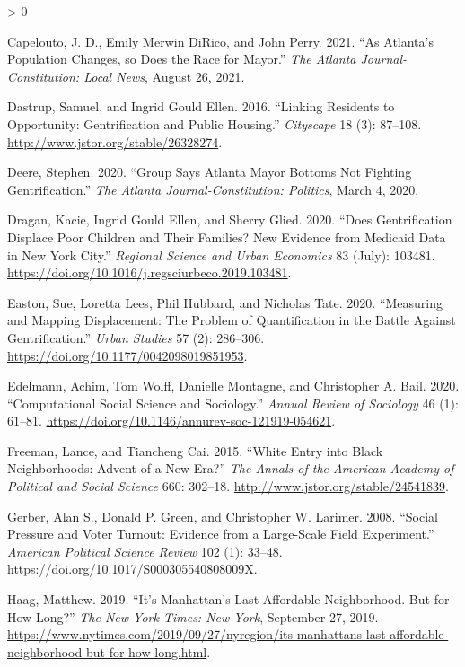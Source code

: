 \documentclass[
  12pt,
]{article}
\newlength{\cslhangindent}
\newenvironment{CSLReferences}[2] %
 {%
  \setlength{\parindent}{0pt}
  \ifodd #1 \everypar{\setlength{\hangindent}{\cslhangindent}}\ignorespaces\fi
  \ifnum #2 > 0
  \setlength{\parskip}{#2\baselineskip}
  \fi
 }%
 {}
\begin{document}
\begin{CSLReferences}{1}{0}
\leavevmode\hypertarget{ref-Capelouto2021}{}%
Capelouto, J. D., Emily Merwin DiRico, and John Perry. 2021. {``As {Atlanta}'s Population Changes, so Does the Race for Mayor.''} \emph{The Atlanta Journal-Constitution: Local News}, August 26, 2021.

\leavevmode\hypertarget{ref-Dastrup2016}{}%
Dastrup, Samuel, and Ingrid Gould Ellen. 2016. {``Linking {Residents} to {Opportunity}: {Gentrification} and {Public Housing}.''} \emph{Cityscape} 18 (3): 87--108. \url{http://www.jstor.org/stable/26328274}.

\leavevmode\hypertarget{ref-Deere2020}{}%
Deere, Stephen. 2020. {``Group Says {Atlanta Mayor Bottoms} Not Fighting Gentrification.''} \emph{The Atlanta Journal-Constitution: Politics}, March 4, 2020.

\leavevmode\hypertarget{ref-Dragan2020}{}%
Dragan, Kacie, Ingrid Gould Ellen, and Sherry Glied. 2020. {``Does Gentrification Displace Poor Children and Their Families? {New} Evidence from Medicaid Data in {New York City}.''} \emph{Regional Science and Urban Economics} 83 (July): 103481. \url{https://doi.org/10.1016/j.regsciurbeco.2019.103481}.

\leavevmode\hypertarget{ref-Easton2020}{}%
Easton, Sue, Loretta Lees, Phil Hubbard, and Nicholas Tate. 2020. {``Measuring and Mapping Displacement: {The} Problem of Quantification in the Battle Against Gentrification.''} \emph{Urban Studies} 57 (2): 286--306. \url{https://doi.org/10.1177/0042098019851953}.

\leavevmode\hypertarget{ref-Edelmann2020}{}%
Edelmann, Achim, Tom Wolff, Danielle Montagne, and Christopher A. Bail. 2020. {``Computational {Social Science} and {Sociology}.''} \emph{Annual Review of Sociology} 46 (1): 61--81. \url{https://doi.org/10.1146/annurev-soc-121919-054621}.

\leavevmode\hypertarget{ref-Freeman2015}{}%
Freeman, Lance, and Tiancheng Cai. 2015. {``White {Entry} into {Black Neighborhoods}: {Advent} of a {New Era}?''} \emph{The Annals of the American Academy of Political and Social Science} 660: 302--18. \url{http://www.jstor.org/stable/24541839}.

\leavevmode\hypertarget{ref-Gerber2008}{}%
Gerber, Alan S., Donald P. Green, and Christopher W. Larimer. 2008. {``Social {Pressure} and {Voter Turnout}: {Evidence} from a {Large-Scale Field Experiment}.''} \emph{American Political Science Review} 102 (1): 33--48. \url{https://doi.org/10.1017/S000305540808009X}.

\leavevmode\hypertarget{ref-Haag2019}{}%
Haag, Matthew. 2019. {``It's {Manhattan}'s {Last Affordable Neighborhood}. {But} for {How Long}?''} \emph{The New York Times: New York}, September 27, 2019. \url{https://www.nytimes.com/2019/09/27/nyregion/its-manhattans-last-affordable-neighborhood-but-for-how-long.html}.


\end{CSLReferences}
\end{document}
